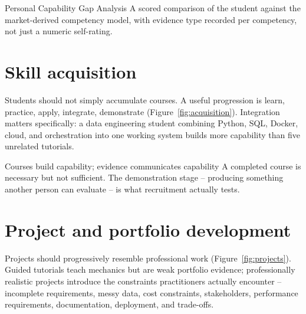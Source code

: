 \documentclass{reportkit}
\begin{document}
\begin{deliverablenote}{Personal Capability Gap Analysis}
A scored comparison of the student against the market-derived competency model, with
evidence type recorded per competency, not just a numeric self-rating.
\end{deliverablenote}

\section{Skill acquisition}
Students should not simply accumulate courses. A useful progression is learn, practice,
apply, integrate, demonstrate (Figure~\ref{fig:acquisition}). Integration matters
specifically: a data engineering student combining Python, SQL, Docker, cloud, and
orchestration into one working system builds more capability than five unrelated
tutorials.

\begin{diagram}[
  type=network,
  caption={Skill acquisition progression.},
  label={fig:acquisition},
  source={Illustrative conceptual progression.},
  description={Five stages in sequence: learn, practice, apply, integrate, demonstrate.}
]
\end{diagram}

\begin{principle}{Courses build capability; evidence communicates capability}
A completed course is necessary but not sufficient. The demonstration stage --
producing something another person can evaluate -- is what recruitment actually
tests.
\end{principle}

\section{Project and portfolio development}
Projects should progressively resemble professional work (Figure~\ref{fig:projects}).
Guided tutorials teach mechanics but are weak portfolio evidence; professionally
realistic projects introduce the constraints practitioners actually encounter --
incomplete requirements, messy data, cost constraints, stakeholders, performance
requirements, documentation, deployment, and trade-offs.
\end{document}

